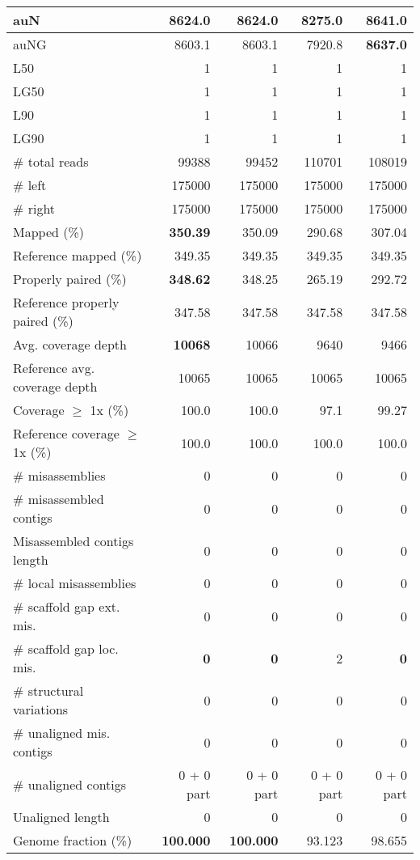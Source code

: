 \documentclass[12pt,a4paper]{article}
\begin{document}
\begin{table}[ht]
\begin{center}
\begin{tabular}{|l*{4}{|r}|}
auN & 8624.0 & 8624.0 & 8275.0 & {\bf 8641.0} \\ \hline
auNG & 8603.1 & 8603.1 & 7920.8 & {\bf 8637.0} \\ \hline
L50 & 1 & 1 & 1 & 1 \\ \hline
LG50 & 1 & 1 & 1 & 1 \\ \hline
L90 & 1 & 1 & 1 & 1 \\ \hline
LG90 & 1 & 1 & 1 & 1 \\ \hline
\# total reads & 99388 & 99452 & 110701 & 108019 \\ \hline
\# left & 175000 & 175000 & 175000 & 175000 \\ \hline
\# right & 175000 & 175000 & 175000 & 175000 \\ \hline
Mapped (\%) & {\bf 350.39} & 350.09 & 290.68 & 307.04 \\ \hline
Reference mapped (\%) & 349.35 & 349.35 & 349.35 & 349.35 \\ \hline
Properly paired (\%) & {\bf 348.62} & 348.25 & 265.19 & 292.72 \\ \hline
Reference properly paired (\%) & 347.58 & 347.58 & 347.58 & 347.58 \\ \hline
Avg. coverage depth & {\bf 10068} & 10066 & 9640 & 9466 \\ \hline
Reference avg. coverage depth & 10065 & 10065 & 10065 & 10065 \\ \hline
Coverage $\geq$ 1x (\%) & 100.0 & 100.0 & 97.1 & 99.27 \\ \hline
Reference coverage $\geq$ 1x (\%) & 100.0 & 100.0 & 100.0 & 100.0 \\ \hline
\# misassemblies & 0 & 0 & 0 & 0 \\ \hline
\# misassembled contigs & 0 & 0 & 0 & 0 \\ \hline
Misassembled contigs length & 0 & 0 & 0 & 0 \\ \hline
\# local misassemblies & 0 & 0 & 0 & 0 \\ \hline
\# scaffold gap ext. mis. & 0 & 0 & 0 & 0 \\ \hline
\# scaffold gap loc. mis. & {\bf 0} & {\bf 0} & 2 & {\bf 0} \\ \hline
\# structural variations & 0 & 0 & 0 & 0 \\ \hline
\# unaligned mis. contigs & 0 & 0 & 0 & 0 \\ \hline
\# unaligned contigs & 0 + 0 part & 0 + 0 part & 0 + 0 part & 0 + 0 part \\ \hline
Unaligned length & 0 & 0 & 0 & 0 \\ \hline
Genome fraction (\%) & {\bf 100.000} & {\bf 100.000} & 93.123 & 98.655 \\ \hline

\end{tabular}
\end{center}
\end{table}
\end{document}
